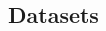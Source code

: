 \documentclass{article}
\begin{document}
\begin{spacing}{0.89}

\vspace{-3mm}
\section{Datasets}
\vspace{-3mm}




\end{spacing}
\end{document}
